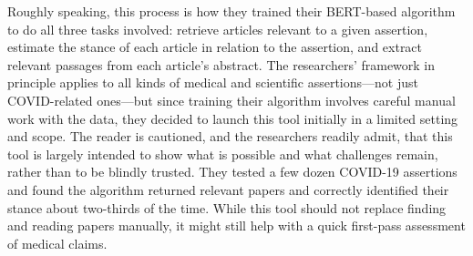 Roughly speaking, this process is how they trained their BERT-based algorithm to do all three tasks involved: retrieve articles relevant
to a given assertion, estimate the stance of each article in relation to the assertion, and extract relevant passages from each article’s abstract. 
The researchers’ framework in principle applies to all kinds of medical and scientific assertions—not just COVID-related ones—but since training their algorithm involves careful manual work with the data, they decided to launch this tool initially in a limited setting and scope. The reader is cautioned, and the researchers readily admit, that this tool is largely intended to show what is possible and what challenges remain, rather than to be blindly trusted. They tested a few dozen COVID-19 assertions and found the algorithm returned relevant papers and correctly identified their stance about two-thirds of the time. While this tool should not replace finding and reading papers manually, it might still help with a quick first-pass assessment of medical claims.
